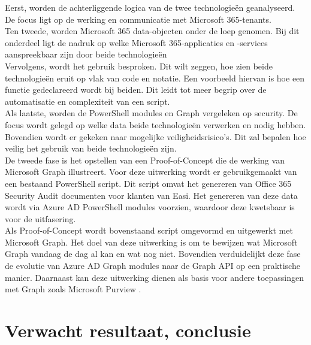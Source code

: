 Eerst, worden de achterliggende logica van de twee technologieën geanalyseerd. De focus ligt op de werking en communicatie met Microsoft 365-tenants. \\

Ten tweede, worden Microsoft 365 data-objecten onder de loep genomen. Bij dit onderdeel ligt de nadruk op welke Microsoft 365-applicaties en -services aanspreekbaar zijn door beide technologieën \\

Vervolgens, wordt het gebruik besproken. Dit wilt zeggen, hoe zien beide technologieën eruit op vlak van code en notatie. Een voorbeeld hiervan is hoe een functie gedeclareerd wordt bij beiden. Dit leidt tot meer begrip over de automatisatie en complexiteit van een script. \\

Als laatste, worden de PowerShell modules en Graph vergeleken op security. De focus wordt gelegd op welke data beide technologieën verwerken en nodig hebben. Bovendien wordt er gekeken naar mogelijke veiligheidsrisico's. Dit zal bepalen hoe veilig het gebruik van beide technologieën zijn. \\

De tweede fase is het opstellen van een Proof-of-Concept die de werking van Microsoft Graph illustreert. Voor deze uitwerking wordt er gebruikgemaakt van een bestaand PowerShell script. Dit script omvat het genereren van Office 365 Security Audit documenten voor klanten van Easi. Het genereren van deze data wordt via Azure AD PowerShell modules voorzien, waardoor deze kwetsbaar is voor de uitfasering. \\

Als Proof-of-Concept wordt bovenstaand script omgevormd en uitgewerkt met Microsoft Graph. Het doel van deze uitwerking is om te bewijzen wat Microsoft Graph vandaag de dag al kan en wat nog niet. Bovendien verduidelijkt deze fase de evolutie van Azure AD Graph modules naar de Graph API op een praktische manier. Daarnaast kan deze uitwerking dienen als basis voor andere toepassingen met Graph zoals Microsoft Purview \autocite{Microsoft2023V}. 

\section{Verwacht resultaat, conclusie}%
\label{sec:verwachte_resultaten}

